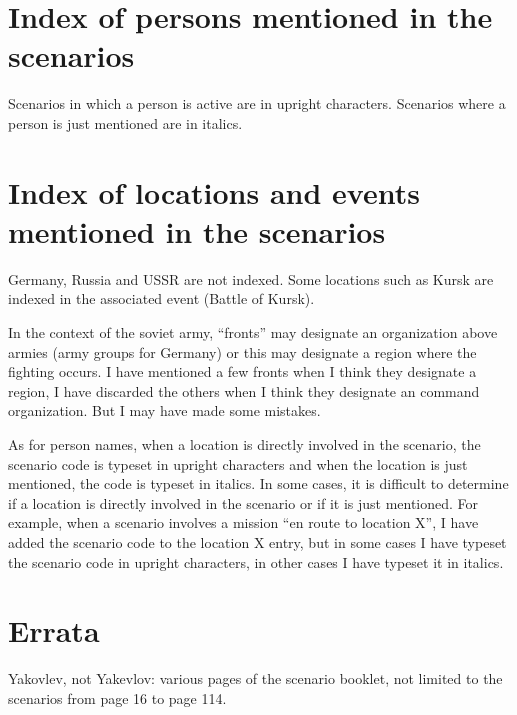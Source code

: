 \documentclass[a4paper,twocolumn]{article}
\begin{document}
\rmfamily
\section*{Index of persons mentioned in the scenarios}

Scenarios in which a person is active are in upright characters.
Scenarios where a person is just mentioned are in italics.

\vspace{3mm}


\section*{Index of locations and events mentioned in the scenarios}

Germany, Russia and USSR are not indexed. Some locations such as
Kursk are indexed in the associated event (Battle of Kursk).

\vspace{3mm}

In the context of the soviet army, ``fronts'' may designate an
organization above armies (army groups for Germany) or this may
designate a region where the fighting occurs. I have mentioned a few
fronts when I think they designate a region, I have discarded the
others when I think they designate an command organization.
But I may have made some mistakes.

\vspace{3mm}

As for person names, when a location is directly involved in the
scenario, the scenario code is typeset in upright characters and when
the location is just mentioned, the code is typeset in italics.
In some cases, it is difficult to determine if a location is directly
involved in the scenario or if it is just mentioned. For example, when
a scenario involves a mission ``en route to location X'', I have
added the scenario code to the location X entry, but in some cases I have
typeset the scenario code in upright characters, in other cases I have
typeset it in italics.

\vspace{3mm}


\section*{Errata}

Yakovlev, not Yakevlov: various pages of the scenario booklet, not limited
to the scenarios from page 16 to page 114.

\end{document}
